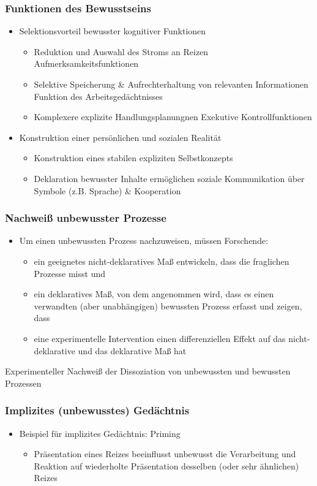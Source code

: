 \subsubsection{Funktionen des Bewusstseins}
\begin{itemize}
	\item Selektionsvorteil bewusster kognitiver Funktionen
		\begin{itemize}
			\item Reduktion und Auswahl des Stroms an Reizen \rightarrow Aufmerksamkeitsfunktionen 
			\item Selektive Speicherung \& Aufrechterhaltung von relevanten Informationen \rightarrow Funktion des Arbeitsgedächtnisses
			\item Komplexere explizite Handlungsplanungnen \rightarrow Exekutive Kontrollfunktionen
		\end{itemize}
	\item Konstruktion einer persönlichen und sozialen Realität
		\begin{itemize}
			\item Konstruktion eines stabilen expliziten Selbstkonzepts
			\item Deklaration bewusster Inhalte ermöglichen soziale Kommunikation über Symbole (z.B. Sprache) \& Kooperation
		\end{itemize}
\end{itemize}
\subsubsection{Nachweiß unbewusster Prozesse}
\begin{itemize}
	\item Um einen unbewussten Prozess nachzuweisen, müssen Forschende:
		\begin{itemize}
			\item ein geeignetes nicht-deklaratives Maß entwickeln, dass die fraglichen Prozesse misst und
			\item ein deklaratives Maß, von dem angenommen wird, dass es einen verwandten (aber unabhängigen) bewussten Prozess erfasst und zeigen, dass
			\item eine experimentelle Intervention einen differenziellen Effekt auf das nicht-deklarative und das deklarative Maß hat
		\end{itemize}
\end{itemize}
\rightarrow Experimenteller Nachweiß der Dissoziation von unbewussten und bewussten Prozessen
\subsubsection{Implizites (unbewusstes) Gedächtnis}
\begin{itemize}
	\item Beispiel für implizites Gedächtnis: Priming
		\begin{itemize}
			\item Präsentation eines Reizes beeinflusst unbewusst die Verarbeitung und Reaktion auf wiederholte Präsentation desselben (oder sehr ähnlichen) Reizes
		\end{itemize}
\end{itemize}

